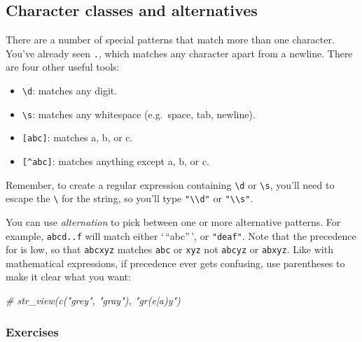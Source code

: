 \documentclass[]{book}
\newenvironment{Shaded}{\begin{snugshade}}{\end{snugshade}}
\newcommand{\CommentTok}[1]{\textcolor[rgb]{0.56,0.35,0.01}{\textit{{#1}}}}
\providecommand{\tightlist}{%
  \setlength{\itemsep}{0pt}\setlength{\parskip}{0pt}}
\begin{document}
\subsection{Character classes and
alternatives}\label{character-classes-and-alternatives}

There are a number of special patterns that match more than one
character. You've already seen \texttt{.}, which matches any character
apart from a newline. There are four other useful tools:

\begin{itemize}
\tightlist
\item
  \texttt{\textbackslash{}d}: matches any digit.
\item
  \texttt{\textbackslash{}s}: matches any whitespace (e.g.~space, tab,
  newline).
\item
  \texttt{{[}abc{]}}: matches a, b, or c.
\item
  \texttt{{[}\^{}abc{]}}: matches anything except a, b, or c.
\end{itemize}

Remember, to create a regular expression containing
\texttt{\textbackslash{}d} or \texttt{\textbackslash{}s}, you'll need to
escape the \texttt{\textbackslash{}} for the string, so you'll type
\texttt{"\textbackslash{}\textbackslash{}d"} or
\texttt{"\textbackslash{}\textbackslash{}s"}.

You can use \emph{alternation} to pick between one or more alternative
patterns. For example, \texttt{abc\textbar{}d..f} will match either
`\,``abc''\,', or \texttt{"deaf"}. Note that the precedence for
\texttt{\textbar{}} is low, so that \texttt{abc\textbar{}xyz} matches
\texttt{abc} or \texttt{xyz} not \texttt{abcyz} or \texttt{abxyz}. Like
with mathematical expressions, if precedence ever gets confusing, use
parentheses to make it clear what you want:

\begin{Shaded}
\begin{Highlighting}[]
\CommentTok{# str_view(c("grey", "gray"), "gr(e|a)y")}
\end{Highlighting}
\end{Shaded}

\subsubsection{Exercises}\label{exercises-33}
\end{document}
